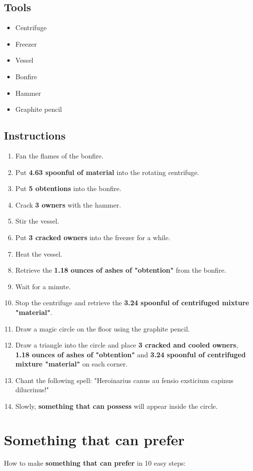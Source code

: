 \documentclass{article}
\begin{document}
\subsection{Tools}\begin{itemize}
\item 
Centrifuge
\item 
Freezer
\item 
Vessel
\item 
Bonfire
\item 
Hammer
\item 
Graphite pencil
\end{itemize}
\subsection{Instructions}\begin{enumerate}
\item 
Fan the flames of the bonfire.
\item 
Put \textbf{4.63 spoonful of material} into the rotating centrifuge.
\item 
Put \textbf{5 obtentions} into the bonfire.
\item 
Crack \textbf{3 owners} with the hammer.
\item 
Stir the vessel.
\item 
Put \textbf{3 cracked owners} into the freezer for a while.
\item 
Heat the vessel.
\item 
Retrieve the \textbf{1.18 ounces of ashes of "obtention"} from the bonfire.
\item 
Wait for a minute.
\item 
Stop the centrifuge and retrieve the \textbf{3.24 spoonful of centrifuged mixture "material"}.
\item 
Draw a magic circle on the floor using the graphite pencil.
\item 
Draw a triangle into the circle and place \textbf{3 cracked and cooled owners}, \textbf{1.18 ounces of ashes of "obtention"} and \textbf{3.24 spoonful of centrifuged mixture "material"} on each corner.
\item 
Chant the following spell: "Heroinarius canus au fensio exsticium capinus dilucrinus!"
\item 
Slowly, \textbf{something that can possess} will appear inside the circle.
\end{enumerate}
\newpage
\section{Something that can prefer}How to make \textbf{something that can prefer} in 10 easy steps:
\end{document}

